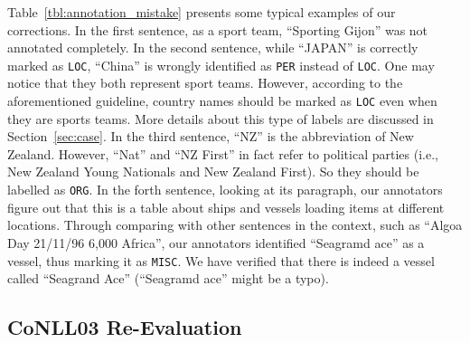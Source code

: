 \documentclass[11pt,a4paper]{article}
\begin{document}
        Table~\ref{tbl:annotation_mistake} presents some typical examples of our corrections.
        In the first sentence, as a sport team, ``Sporting Gijon'' was not annotated completely. 
        In the second sentence, while ``JAPAN'' is correctly marked as \texttt{LOC},  ``China'' is wrongly identified as \texttt{PER} instead of \texttt{LOC}. 
        One may notice that they both represent sport teams.
        However, according to the aforementioned guideline, country names should be marked as \texttt{LOC} even when they are sports teams. 
        More details about this type of labels are discussed in Section~\ref{sec:case}. 
        In the third sentence, ``NZ'' is the abbreviation of New Zealand.
        However, ``Nat'' and ``NZ First'' in fact refer to political parties (i.e., New Zealand Young Nationals and New Zealand First). 
        So they should be labelled as \texttt{ORG}. 
        In the forth sentence, looking at its paragraph, our annotators figure out that this is a table about ships and vessels loading items at different locations. 
        Through comparing with other sentences in the context, such as ``Algoa Day	21/11/96 6,000 Africa'', our annotators identified ``Seagramd ace'' as a vessel, thus marking it as \texttt{MISC}.
        We have verified that there is indeed a vessel called ``Seagrand Ace'' (``Seagramd ace'' might be a typo). 
    
    \subsection{CoNLL03 Re-Evaluation} \label{sec:re-eval}
    
\end{document}
